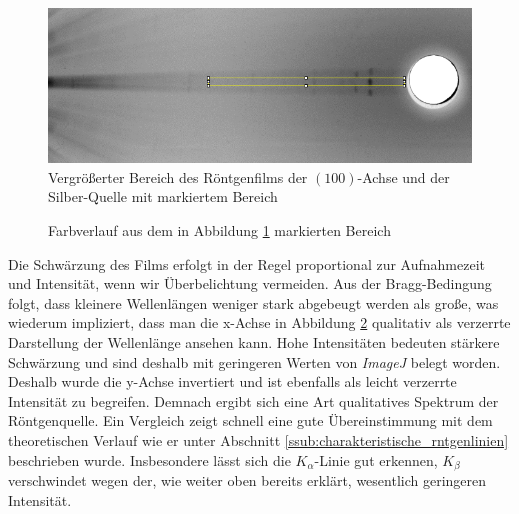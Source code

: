 	\begin{figure}[htb]
		\centering
		\includegraphics[scale=0.5]{images/ausschnitt.png}
		\caption{Vergrößerter Bereich des Röntgenfilms der $(100)$-Achse und der Silber-Quelle mit markiertem Bereich}
		\label{fig:ausschnitt}
	\end{figure}

	\begin{figure}[htb]
		\centering
		
		\caption{Farbverlauf aus dem in Abbildung \ref{fig:ausschnitt} markierten Bereich}
		\label{fig:spec}
	\end{figure}

	Die Schwärzung des Films erfolgt in der Regel proportional zur Aufnahmezeit und Intensität, wenn wir Überbelichtung vermeiden.
	Aus der Bragg-Bedingung folgt, dass kleinere Wellenlängen weniger stark abgebeugt werden als große, was wiederum impliziert, dass man die x-Achse in Abbildung \ref{fig:spec} qualitativ als verzerrte Darstellung der Wellenlänge ansehen kann.
	Hohe Intensitäten bedeuten stärkere Schwärzung und sind deshalb mit geringeren Werten von \textit{ImageJ} belegt worden.
	Deshalb wurde die y-Achse invertiert und ist ebenfalls als leicht verzerrte Intensität zu begreifen.
	Demnach ergibt sich eine Art qualitatives Spektrum der Röntgenquelle.
	Ein Vergleich zeigt schnell eine gute Übereinstimmung mit dem theoretischen Verlauf wie er unter Abschnitt \ref{ssub:charakteristische_rntgenlinien} beschrieben wurde.
	Insbesondere lässt sich die $K_\alpha$-Linie gut erkennen, $K_\beta$ verschwindet wegen der, wie weiter oben bereits erklärt, wesentlich geringeren Intensität.

